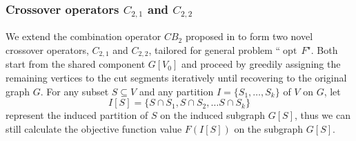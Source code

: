 \documentclass[12pt, a4paper]{article}%
\DeclareMathOperator*{\opt}{\ensuremath{opt}}
\newcommand{\labeling}{\ensuremath{\mathrm{lab}}}
\numberwithin{equation}{section}
\theoremstyle{plain}
\begin{document}

\subsubsection{Crossover operators $C_{2,1}$ and $C_{2,2}$}
\label{sec::c2c3}

We extend the combination operator $CB_2$ proposed in \cite{Marti2009} to form two novel crossover operators, $C_{2,1}$ and $C_{2,2}$, tailored for general problem ``$\opt\,F$". Both start from the shared component $G[V_0]$ and proceed by greedily assigning the remaining vertices to the cut segments iteratively until recovering to the original graph $G$. For any subset $S\subseteq V$ and any partition $I=\{S_1,\ldots,S_k\}$ of $V$ on $G$, let $$I[S]=\{S\cap S_1,S\cap S_2,\ldots S\cap S_k\}$$ represent the induced partition of $S$ on the induced subgraph $G[S]$, thus we can still calculate the objective function value $F(I[S])$ on the subgraph $G[S]$. 
\end{document}
